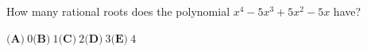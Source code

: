 How many rational roots does the polynomial $x^4-5x^3+5x^2-5x$ have?

$\textbf{(A)}\ 0$\qquad$\textbf{(B)}\ 1$\qquad$\textbf{(C)}\ 2$\qquad$\textbf{(D)}\ 3$\qquad$\textbf{(E)}\ 4$
